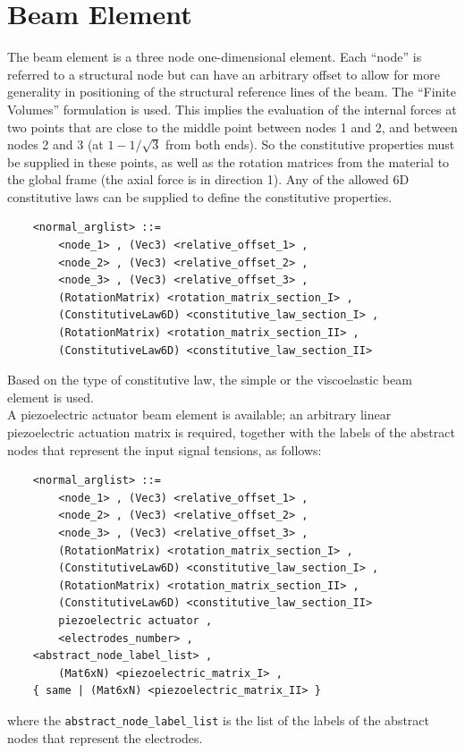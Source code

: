 \documentclass[10pt,dvips]{report}
\begin{document}
\section{Beam Element}

The beam element is a three node one-dimensional element.
Each ``node'' is referred to a structural node but can have an arbitrary
offset to allow for more generality in positioning of the structural 
reference lines of the beam.
The ``Finite Volumes'' formulation is used. 
This implies the evaluation of the internal forces at two points 
that are close to the middle point between nodes 1 and 2, 
and between nodes 2 and 3 (at $ 1-1/\sqrt{3} $ from both ends).
So the constitutive properties must be supplied in these points, as well as
the rotation matrices from the material to the global frame (the axial force
is in direction 1).
Any of the allowed 6D constitutive laws can be supplied to define the
constitutive properties.
\begin{verbatim}
    <normal_arglist> ::=
        <node_1> , (Vec3) <relative_offset_1> ,
        <node_2> , (Vec3) <relative_offset_2> ,
        <node_3> , (Vec3) <relative_offset_3> ,
        (RotationMatrix) <rotation_matrix_section_I> ,
        (ConstitutiveLaw6D) <constitutive_law_section_I> ,
        (RotationMatrix) <rotation_matrix_section_II> ,
        (ConstitutiveLaw6D) <constitutive_law_section_II>
\end{verbatim}
Based on the type of constitutive law, the simple or the viscoelastic beam
element is used. \\
A piezoelectric actuator beam element is available; an arbitrary
linear piezoelectric actuation matrix is required, together with the labels
of the abstract nodes that represent the input signal tensions, as follows:
\begin{verbatim}
    <normal_arglist> ::=
        <node_1> , (Vec3) <relative_offset_1> ,
        <node_2> , (Vec3) <relative_offset_2> ,
        <node_3> , (Vec3) <relative_offset_3> ,
        (RotationMatrix) <rotation_matrix_section_I> ,
        (ConstitutiveLaw6D) <constitutive_law_section_I> ,
        (RotationMatrix) <rotation_matrix_section_II> ,
        (ConstitutiveLaw6D) <constitutive_law_section_II>
        piezoelectric actuator , 
        <electrodes_number> ,
	<abstract_node_label_list> ,
        (Mat6xN) <piezoelectric_matrix_I> ,
	{ same | (Mat6xN) <piezoelectric_matrix_II> }
\end{verbatim}
where the {\tt abstract\_node\_label\_list} is the list of the labels of the
abstract nodes that represent the electrodes.
\end{document}
